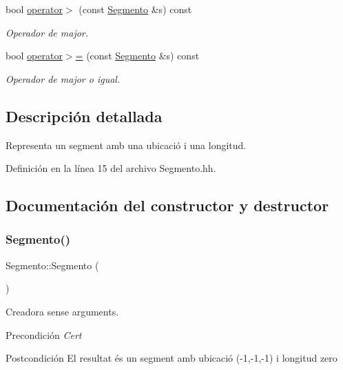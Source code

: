 \begin{DoxyCompactItemize}
bool \hyperlink{class_segmento_a01c2aa376384c7a75ef22196db361d2e}{operator$>$} (const \hyperlink{class_segmento}{Segmento} \&s) const
\begin{DoxyCompactList}\small\item\em Operador de major. \end{DoxyCompactList}\item 
bool \hyperlink{class_segmento_a74e0ca47b9bf2316a0f55351529380f6}{operator$>$=} (const \hyperlink{class_segmento}{Segmento} \&s) const
\begin{DoxyCompactList}\small\item\em Operador de major o igual. \end{DoxyCompactList}\end{DoxyCompactItemize}


\subsection{Descripción detallada}
Representa un segment amb una ubicació i una longitud. 

Definición en la línea 15 del archivo Segmento.\+hh.



\subsection{Documentación del constructor y destructor}
\mbox{\label{class_segmento_af8ce1463824db8cd38084f4f75d3b192}} 
\subsubsection{\texorpdfstring{Segmento()}{Segmento()}\hspace{0.1cm}{\footnotesize\ttfamily [1/3]}}
{\footnotesize\ttfamily Segmento\+::\+Segmento (\begin{DoxyParamCaption}{ }\end{DoxyParamCaption})}



Creadora sense arguments. 

\begin{DoxyPrecond}{Precondición}
{\itshape Cert} 
\end{DoxyPrecond}
\begin{DoxyPostcond}{Postcondición}
El resultat és un segment amb ubicació (-\/1,-\/1,-\/1) i longitud zero 
\end{DoxyPostcond}
\mbox{\label{class_segmento_a325e58fb03daa6d14ceeb3c4759b042d}} 
